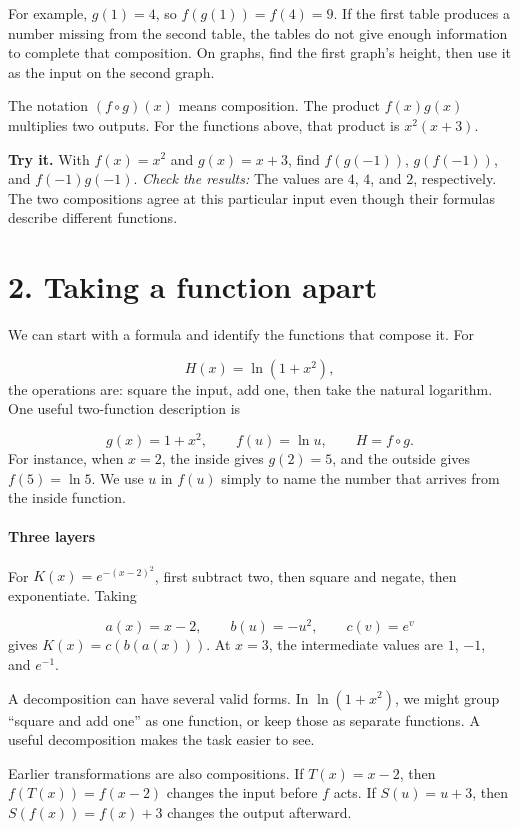 \documentclass[11pt,letterpaper]{article}
\begin{document}
For example, \(g(1)=4\), so \(f(g(1))=f(4)=9\). If the first table produces a number missing from the second table, the tables do not give enough information to complete that composition. On graphs, find the first graph's height, then use it as the input on the second graph.

The notation \((f\circ g)(x)\) means composition. The product \(f(x)g(x)\) multiplies two outputs. For the functions above, that product is \(x^2(x+3)\).

\textbf{Try it.} With \(f(x)=x^2\) and \(g(x)=x+3\), find \(f(g(-1))\), \(g(f(-1))\), and \(f(-1)g(-1)\).
\textit{Check the results:} The values are \(4\), \(4\), and \(2\), respectively. The two compositions agree at this particular input even though their formulas describe different functions.







\section*{2. Taking a function apart}
We can start with a formula and identify the functions that compose it. For

\[H(x)=\ln(1+x^2),\]the operations are: square the input, add one, then take the natural logarithm. One useful two-function description is

\[g(x)=1+x^2,\qquad f(u)=\ln u,\qquad H=f\circ g.\]For instance, when \(x=2\), the inside gives \(g(2)=5\), and the outside gives \(f(5)=\ln5\). We use \(u\) in \(f(u)\) simply to name the number that arrives from the inside function.


\paragraph{Three layers} For \(K(x)=e^{-(x-2)^2}\), first subtract two, then square and negate, then exponentiate. Taking

\[a(x)=x-2,\qquad b(u)=-u^2,\qquad c(v)=e^v\]gives \(K(x)=c(b(a(x)))\). At \(x=3\), the intermediate values are \(1\), \(-1\), and \(e^{-1}\).



A decomposition can have several valid forms. In \(\ln(1+x^2)\), we might group ``square and add one'' as one function, or keep those as separate functions. A useful decomposition makes the task easier to see.

Earlier transformations are also compositions. If \(T(x)=x-2\), then \(f(T(x))=f(x-2)\) changes the input before \(f\) acts. If \(S(u)=u+3\), then \(S(f(x))=f(x)+3\) changes the output afterward.
\end{document}
